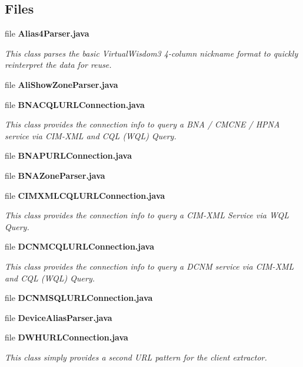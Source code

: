 \subsection*{Files}
\begin{DoxyCompactItemize}
\item 
file {\bf Alias4\+Parser.\+java}
\begin{DoxyCompactList}\small\item\em This class parses the basic Virtual\+Wisdom3 4-\/column nickname format to quickly reinterpret the data for reuse. \end{DoxyCompactList}\item 
file {\bf Ali\+Show\+Zone\+Parser.\+java}
\item 
file {\bf B\+N\+A\+C\+Q\+L\+U\+R\+L\+Connection.\+java}
\begin{DoxyCompactList}\small\item\em This class provides the connection info to query a B\+N\+A / C\+M\+C\+N\+E / H\+P\+N\+A service via C\+I\+M-\/\+X\+M\+L and C\+Q\+L (W\+Q\+L) Query. \end{DoxyCompactList}\item 
file {\bf B\+N\+A\+P\+U\+R\+L\+Connection.\+java}
\item 
file {\bf B\+N\+A\+Zone\+Parser.\+java}
\item 
file {\bf C\+I\+M\+X\+M\+L\+C\+Q\+L\+U\+R\+L\+Connection.\+java}
\begin{DoxyCompactList}\small\item\em This class provides the connection info to query a C\+I\+M-\/\+X\+M\+L Service via W\+Q\+L Query. \end{DoxyCompactList}\item 
file {\bf D\+C\+N\+M\+C\+Q\+L\+U\+R\+L\+Connection.\+java}
\begin{DoxyCompactList}\small\item\em This class provides the connection info to query a D\+C\+N\+M service via C\+I\+M-\/\+X\+M\+L and C\+Q\+L (W\+Q\+L) Query. \end{DoxyCompactList}\item 
file {\bf D\+C\+N\+M\+S\+Q\+L\+U\+R\+L\+Connection.\+java}
\item 
file {\bf Device\+Alias\+Parser.\+java}
\item 
file {\bf D\+W\+H\+U\+R\+L\+Connection.\+java}
\begin{DoxyCompactList}\small\item\em This class simply provides a second U\+R\+L pattern for the client extractor. \end{DoxyCompactList}\item 

\end{DoxyCompactItemize}
